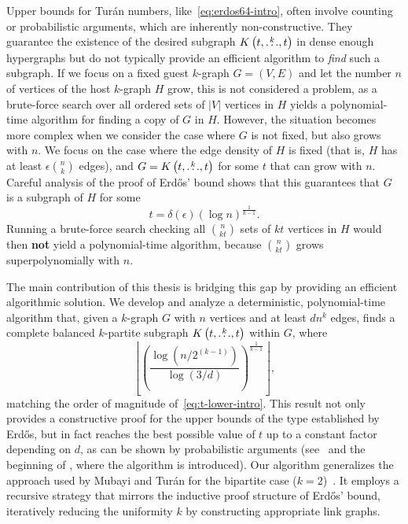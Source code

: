 Upper bounds for Turán numbers, like~\eqref{eq:erdos64-intro},
often involve counting or probabilistic arguments,
which are inherently non-constructive.
They guarantee the existence of the desired subgraph $K\left(t, \overset{k}{\dots}, t\right)$
in dense enough hypergraphs but do not typically provide an efficient algorithm to \emph{find} such a subgraph.
If we focus on a fixed guest $k$-graph $G = (V, E)$ and let the number $n$ of vertices of the host $k$-graph $H$ grow,
this is not considered a problem,
as a brute-force search over all ordered sets of $|V|$ vertices in $H$ yields a polynomial-time algorithm
for finding a copy of $G$ in $H$.
However, the situation becomes more complex when we consider the case where $G$ is not fixed, but also grows with $n$.
We focus on the case where the edge density of $H$ is fixed (that is, $H$ has at least $\epsilon \binom{n}{k}$ edges),
and $G = K\left(t, \overset{k}{\dots}, t\right)$ for some $t$ that can grow with $n$.
Careful analysis of the proof of Erdős' bound shows that this guarantees that $G$ is a subgraph of $H$ for some
\begin{equation} \label{eq:t-lower-intro}
    t = \delta(\epsilon) (\log n)^{\frac{1}{k-1}}.
\end{equation}
Running a brute-force search checking all $\binom{n}{kt}$ sets of $kt$
vertices in $H$ would then \textbf{not} yield a polynomial-time algorithm,
because $\binom{n}{kt}$ grows superpolynomially with $n$.

The main contribution of this thesis is bridging this gap by providing an efficient algorithmic solution.
We develop and analyze a deterministic, polynomial-time algorithm that,
given a $k$-graph $G$ with $n$ vertices and at least $dn^k$ edges,
finds a complete balanced $k$-partite subgraph $K\left(t, \overset{k}{\dots}, t\right)$ within $G$, where
\[
    \left\lfloor \left(  \frac{\log \left(n/2^{(k-1)}\right)}{\log (3/d)} \right)^{\frac{1}{k-1}} \right\rfloor,
\]
matching the order of magnitude of~\eqref{eq:t-lower-intro}.
This result not only provides a constructive proof for the upper bounds of the type established by Erdős,
but in fact reaches the best possible value of $t$ up to a constant factor depending on $d$, as
can be shown by probabilistic arguments (see~ and
the beginning of , where the algorithm is introduced).
Our algorithm generalizes the approach used by Mubayi and Turán for the bipartite case ($k=2$)~\cite{MUBAYI2010174}.
It employs a recursive strategy that mirrors the inductive proof structure of Erdős' bound,
iteratively reducing the uniformity $k$ by constructing appropriate link graphs.

